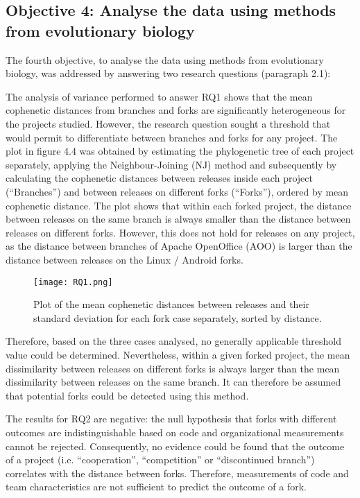 \subsection{Objective 4: Analyse the data using methods from evolutionary biology}
The fourth objective, to analyse the data using methods from evolutionary biology, was addressed by answering two research questions (paragraph 2.1):

The analysis of variance performed to answer RQ1 shows that the mean cophenetic distances from branches and forks are significantly heterogeneous for the projects studied. However, the research question sought a threshold that would permit to differentiate between branches and forks for any project. The plot in figure 4.4 was obtained by estimating the phylogenetic tree of each project separately, applying the Neighbour-Joining (NJ) method and subsequently by calculating the cophenetic distances between releases inside each project (“Branches”) and between releases on different forks (“Forks”), ordered by mean cophenetic distance. The plot shows that within each forked project, the distance between releases on the same branch is always smaller than the distance between releases on different forks. However, this does not hold for releases on any project, as the distance between branches of Apache OpenOffice (AOO) is larger than the distance between releases on the Linux / Android forks.

\begin{figure}[H]
  \texttt{[image: RQ1.png]}
  \caption{Plot of the mean cophenetic distances between releases and their standard deviation for each fork case separately, sorted by distance.}
  \label{fig:rq1}
\end{figure}


Therefore, based on the three cases analysed, no generally applicable threshold value could be determined. Nevertheless, within a given forked project, the mean dissimilarity between releases on different forks is always larger than the mean dissimilarity between releases on the same branch. It can therefore be assumed that potential forks could be detected using this method.


The results for RQ2 are negative: the null hypothesis that forks with different outcomes are indistinguishable based on code and organizational measurements cannot be rejected. Consequently, no evidence could be found that the outcome of a project (i.e. “cooperation”, “competition” or “discontinued branch”) correlates with the distance between forks. Therefore, measurements of code and team characteristics are not sufficient to predict the outcome of a fork.

